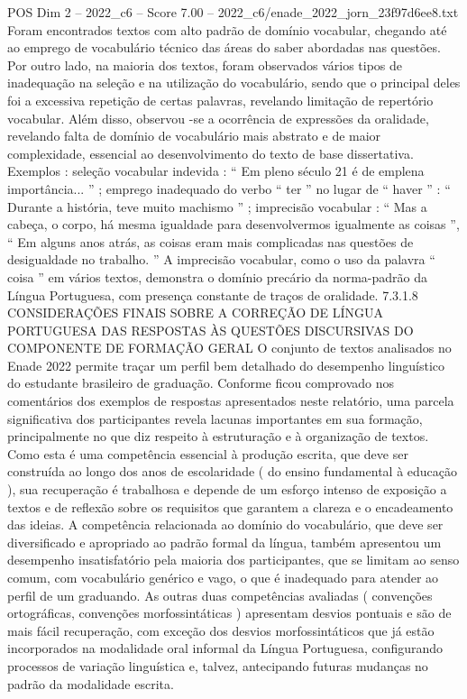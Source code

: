 \begin{textsample}{POS Dim 2 – 2022\_c6 – Score 7.00 – 2022\_c6/enade\_2022\_jorn\_23f97d6ee8.txt}
Foram encontrados textos com alto padrão de domínio vocabular, chegando até ao emprego de vocabulário técnico das áreas do saber abordadas nas questões.
Por outro lado, na maioria dos textos, foram observados vários tipos de inadequação na seleção e na utilização do vocabulário, sendo que o principal deles foi a excessiva repetição de certas palavras, revelando limitação de repertório vocabular.
Além disso, observou -se a ocorrência de expressões da oralidade, revelando falta de domínio de vocabulário mais abstrato e de maior complexidade, essencial ao desenvolvimento do texto de base dissertativa.
Exemplos : seleção vocabular indevida : “ Em pleno século 21 é de emplena importância... ” ; emprego inadequado do verbo “ ter ” no lugar de “ haver ” : “ Durante a história, teve muito machismo ” ; imprecisão vocabular : “ Mas a cabeça, o corpo, há mesma igualdade para desenvolvermos igualmente as coisas ”, “ Em alguns anos atrás, as coisas eram mais complicadas nas questões de desigualdade no trabalho. ” A imprecisão vocabular, como o uso da palavra “ coisa ” em vários textos, demonstra o domínio precário da norma-padrão da Língua Portuguesa, com presença constante de traços de oralidade. 7.3.1.8 CONSIDERAÇÕES FINAIS SOBRE A CORREÇÃO DE LÍNGUA PORTUGUESA DAS RESPOSTAS ÀS QUESTÕES DISCURSIVAS DO COMPONENTE DE FORMAÇÃO GERAL O conjunto de textos analisados no Enade 2022 permite traçar um perfil bem detalhado do desempenho linguístico do estudante brasileiro de graduação.
Conforme ficou comprovado nos comentários dos exemplos de respostas apresentados neste relatório, uma parcela significativa dos participantes revela lacunas importantes em sua formação, principalmente no que diz respeito à estruturação e à organização de textos.
Como esta é uma competência essencial à produção escrita, que deve ser construída ao longo dos anos de escolaridade ( do ensino fundamental à educação ), sua recuperação é trabalhosa e depende de um esforço intenso de exposição a textos e de reflexão sobre os requisitos que garantem a clareza e o encadeamento das ideias.
A competência relacionada ao domínio do vocabulário, que deve ser diversificado e apropriado ao padrão formal da língua, também apresentou um desempenho insatisfatório pela maioria dos participantes, que se limitam ao senso comum, com vocabulário genérico e vago, o que é inadequado para atender ao perfil de um graduando.
As outras duas competências avaliadas ( convenções ortográficas, convenções morfossintáticas ) apresentam desvios pontuais e são de mais fácil recuperação, com exceção dos desvios morfossintáticos que já estão incorporados na modalidade oral informal da Língua Portuguesa, configurando processos de variação linguística e, talvez, antecipando futuras mudanças no padrão da modalidade escrita.

\end{textsample}
